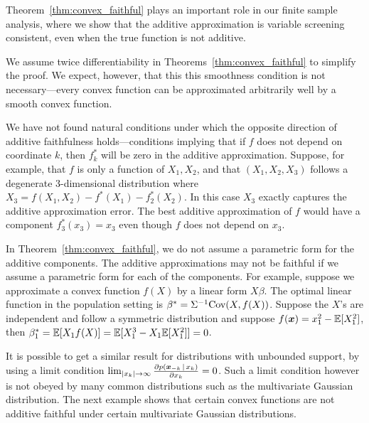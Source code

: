 Theorem~\ref{thm:convex_faithful} plays an important role in our
finite sample analysis, where we show that the additive
approximation is variable screening consistent, even when the true function is not
additive.


\begin{remark}
  We assume twice differentiability in
  Theorems~\ref{thm:convex_faithful} to simplify the proof.  We
  expect, however, that this this smoothness condition is not
  necessary---every convex function can be approximated arbitrarily
  well by a smooth convex function.
\end{remark}


\begin{remark} 
  We have not found natural conditions under which the opposite
  direction of additive faithfulness holds---conditions implying that if $f$ does not
  depend on coordinate $k$, then $f_k^*$ will be zero in the additive
  approximation.  Suppose, for example, that $f$ is only a
  function of $X_1, X_2$, and that $(X_1, X_2, X_3)$ follows a
  degenerate 3-dimensional distribution where $X_3 = f(X_1, X_2) -
  f^*(X_1) - f^*_2(X_2)$.  In this case $X_3$ exactly captures the
  additive approximation error.  The best additive
  approximation of $f$ would have a component $f^*_3(x_3) = x_3$ even
  though $f$ does not depend on $x_3$.
\end{remark}


\begin{remark}
In Theorem~\ref{thm:convex_faithful}, we do not assume a parametric form for the additive components. The additive approximations may not be faithful if we assume a parametric form for each of the components. For example, suppose we approximate a convex function $f(X)$ by a linear form $X \beta$. The optimal linear function in the population setting is $\beta^* = \Sigma^{-1} \textrm{Cov}(X, f(X))$. Suppose the $X$'s are independent and follow a symmetric distribution and suppose $f(\mbox{\boldmath $x$}) = x_1^2 - {\mathbb E}[X_1^2]$, then $\beta^*_1 = {\mathbb E}[ X_1 f(X)] = {\mathbb E}[ X_1^3 - X_1 {\mathbb E}[X_1^2]] = 0$.
\end{remark}


\begin{remark}
It is possible to get a similar result for distributions with
unbounded support, by using a limit condition $\lim_{|x_k| \rightarrow
  \infty} \frac{\partial p(\mbox{\boldmath $\scriptstyle x$}_{-k} {\,|\,} x_k)}{\partial x_k}
= 0$.  Such a limit condition however is not obeyed by many common distributions such as the multivariate Gaussian distribution. The next example shows that certain convex functions are not additive faithful under certain multivariate Gaussian distributions.
\end{remark}

